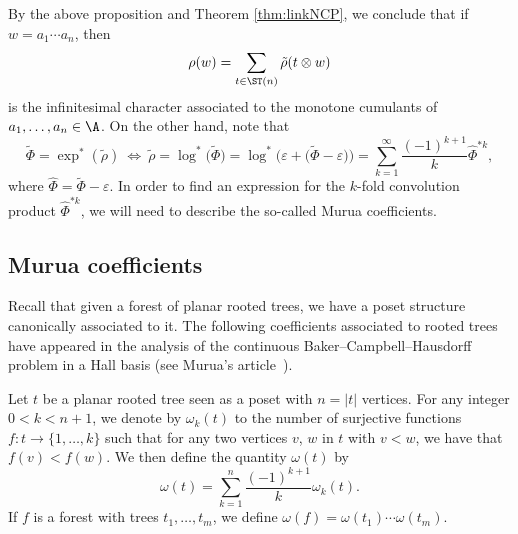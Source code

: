 By the above proposition and Theorem \ref{thm:linkNCP}, we conclude that if $w=a_1\cdots a_n$, then
\begin{equation}
\label{eq:rhoiota}
\rho(w) = \sum_{t\in \ST(n)} \tilde{\rho}(t\otimes w)
\end{equation}
is the infinitesimal character associated to the monotone cumulants of $a_1,\dots,a_n\in \A$. On the other hand, note that
\[
	\tilde\Phi
	= \exp^*(\tilde\rho) \ \Leftrightarrow \ \tilde\rho
	= \log^*\big(\tilde\Phi\big)
	= \log^*\big(\varepsilon + \big(\tilde\Phi - \varepsilon\big)\big)
	= \sum_{k=1}^\infty \frac{(-1)^{k+1}}{k} \hat\Phi^{* k},
\]
where $\hat\Phi = \tilde\Phi - \varepsilon$. In order to find an expression for the $k$-fold convolution product $\hat\Phi^{*k}$, we will need to describe the so-called Murua coefficients.


\subsection{Murua coefficients}
\label{ssec:Murua}

Recall that given a forest of planar rooted trees, we have a poset structure canonically associated to it. The following coefficients associated to rooted trees have appeared in the analysis of the continuous Baker--Campbell--Hausdorff problem in a Hall basis (see Murua's article~\cite{Murua}).

\begin{Definition}
Let $t$ be a planar rooted tree seen as a poset with $n = |t|$ vertices. For any integer $0 < k< n+1$, we denote by $\omega_k(t)$ to the number of surjective functions $f\colon t\to \{1,\dots,k\}$ such that for any two vertices $v$, $w$ in $t$ with $v<w$, we have that $f(v)<f(w)$. We then define the quantity $\omega(t)$ by
\begin{equation}\label{eq:muruacoeff}
\omega(t) = \sum_{k=1}^n \frac{(-1)^{k+1}}{k} \omega_k(t).
\end{equation}
If $f$ is a forest with trees $t_1,\dots, t_m$, we define $\omega(f) = \omega(t_1)\cdots \omega(t_m).$
\end{Definition}
